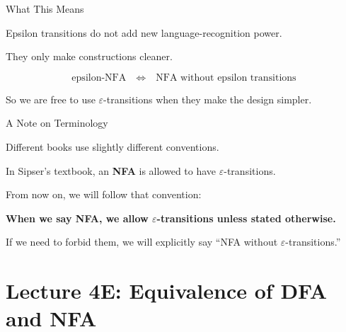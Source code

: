 \documentclass[10pt,aspectratio=169]{beamer}
\newcommand{\eps}{\varepsilon}
\begin{document}
\begin{frame}{What This Means}

Epsilon transitions do not add new language-recognition power.

\vspace{0.8em}

They only make constructions cleaner.

\[
\text{epsilon-NFA}
\quad\Longleftrightarrow\quad
\text{NFA without epsilon transitions}
\]

\vspace{0.8em}

\pause

So we are free to use \(\eps\)-transitions when they make the design simpler.


\end{frame}

\begin{frame}{A Note on Terminology}

Different books use slightly different conventions.

\vspace{0.8em}

In Sipser's textbook, an \textbf{NFA} is allowed to have \(\eps\)-transitions.

\vspace{0.8em}

From now on, we will follow that convention:

\begin{center}
\textbf{When we say NFA, we allow \(\eps\)-transitions unless stated otherwise.}
\end{center}

\vspace{0.8em}

If we need to forbid them, we will explicitly say ``NFA without \(\eps\)-transitions.''

\end{frame}

\section{Lecture 4E: Equivalence of DFA and NFA}
\end{document}
